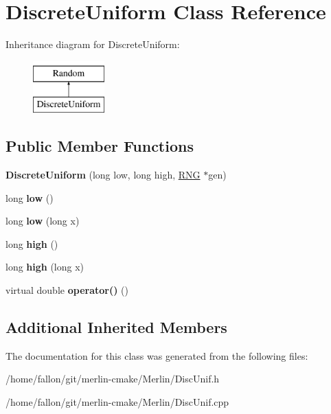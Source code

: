 \hypertarget{classDiscreteUniform}{}\section{Discrete\+Uniform Class Reference}
\label{classDiscreteUniform}
Inheritance diagram for Discrete\+Uniform\+:\begin{figure}[H]
\begin{center}
\leavevmode
\includegraphics[height=2.000000cm]{classDiscreteUniform}
\end{center}
\end{figure}
\subsection*{Public Member Functions}
\begin{DoxyCompactItemize}
\item 
\mbox{\label{classDiscreteUniform_a4cd644abbd479ee58e8b6bf70686db7a}} 
{\bfseries Discrete\+Uniform} (long low, long high, \hyperlink{classRNG}{R\+NG} $\ast$gen)
\item 
\mbox{\label{classDiscreteUniform_a68f6f2ad8c6c328e93e1585266034ad0}} 
long {\bfseries low} ()
\item 
\mbox{\label{classDiscreteUniform_a109761f3438d492cacd657c4b9aabaed}} 
long {\bfseries low} (long x)
\item 
\mbox{\label{classDiscreteUniform_a7de12b0dfdda18803f90fe15d7449483}} 
long {\bfseries high} ()
\item 
\mbox{\label{classDiscreteUniform_adad3426a37c3e33d8619611994b164fd}} 
long {\bfseries high} (long x)
\item 
\mbox{\label{classDiscreteUniform_af10e3df9f920c1b3c9f77f1255c80494}} 
virtual double {\bfseries operator()} ()
\end{DoxyCompactItemize}
\subsection*{Additional Inherited Members}


The documentation for this class was generated from the following files\+:\begin{DoxyCompactItemize}
\item 
/home/fallon/git/merlin-\/cmake/\+Merlin/Disc\+Unif.\+h\item 
/home/fallon/git/merlin-\/cmake/\+Merlin/Disc\+Unif.\+cpp\end{DoxyCompactItemize}
